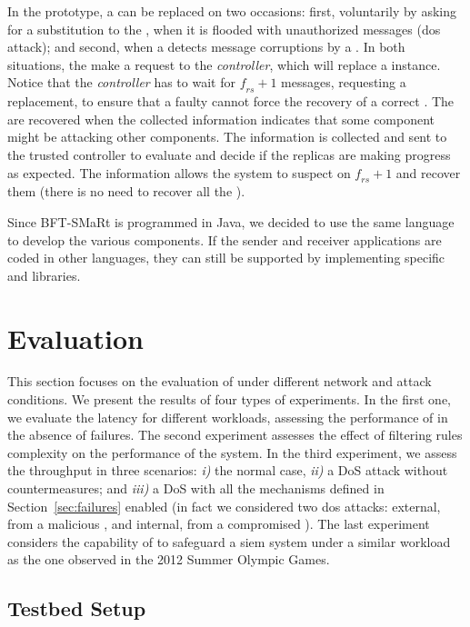 In the prototype, a \presieve can be replaced on two occasions: first, voluntarily by asking for a substitution to the \repsieves, when it is flooded with unauthorized messages (\gls{dos} attack); and second, when a \repsieve detects message corruptions by a \presieve.
In both situations, the \repsieves make a request to the \emph{controller}, which will replace a \presieve instance.
Notice that the \emph{controller} has to wait for $\mathit{f_{rs}+1}$ messages, requesting a \presieve replacement, to ensure that a faulty \repsieve cannot force the recovery of a correct \presieve.
The \repsieves are recovered when the collected information indicates that some component might be attacking other components.
The information is collected and sent to the trusted controller to evaluate and decide if the replicas are making progress as expected.
The information allows the system to suspect on $\mathit{f_{rs}+1}$ \repsieves and recover them (there is no need to recover all the \repsieves).


Since BFT-SMaRt is programmed in Java, we decided to use the same language to develop the various \sieveq components. 
If the sender and receiver applications are coded in other languages, they can still be supported by implementing specific \sender and \postsieve libraries.


\section{Evaluation}
\label{evaluation}


This section focuses on the evaluation of \sieveq under different network and attack conditions.
We present the results of four types of experiments.
In the first one, we evaluate the latency for different \sender workloads, assessing the performance of \sieveq in the absence of failures.
The second experiment assesses the effect of filtering rules complexity on the performance of the system.
In the third experiment, we assess the throughput in three scenarios: \emph{i)} the normal case, \emph{ii)} a DoS attack without countermeasures; and \emph{iii)} a DoS with all the mechanisms defined in Section~\ref{sec:failures} enabled (in fact we considered two \gls{dos} attacks: external, from a malicious \sender, and internal, from a compromised \repsieve).
The last experiment considers the capability of \sieveq to safeguard a \gls{siem} system under a similar workload as the one observed in the 2012 Summer Olympic Games.

\subsection{Testbed Setup}

